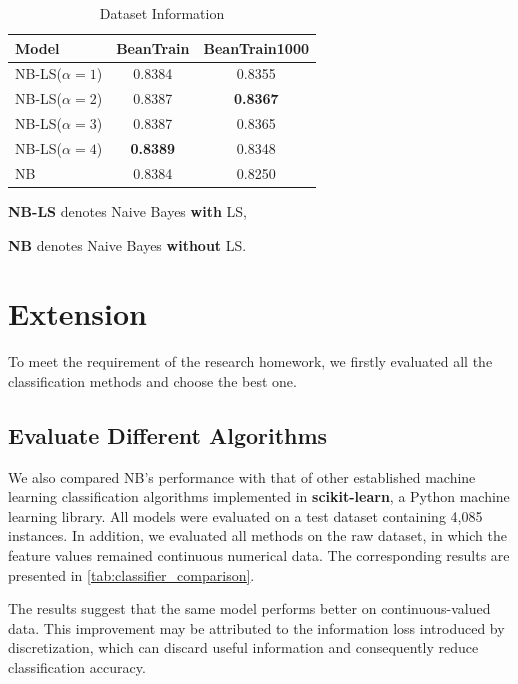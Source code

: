 \documentclass[10pt,a4paper]{article}
\begin{document}
	
	\begin{table}[htbp]
		\centering
		\caption{Dataset Information}
		\label{tab:test1}
		\begin{threeparttable}
			\begin{tabular}{lcc}
				\toprule
				\textbf{Model} & \textbf{BeanTrain} & \textbf{BeanTrain1000} \\
				\midrule
				NB-LS($ \alpha = 1 $) & 0.8384 & 0.8355 \\
				NB-LS($ \alpha = 2 $) & 0.8387 & \textbf{0.8367} \\
				NB-LS($ \alpha = 3 $) & 0.8387 & 0.8365 \\
				NB-LS($ \alpha = 4 $) & \textbf{0.8389} & 0.8348 \\
				NB    & 0.8384 & 0.8250 \\
				
				\bottomrule
			\end{tabular}
			\begin{tablenotes}[flushleft]
				\footnotesize
				\item \textbf{NB-LS} denotes Naive Bayes \textbf{with} LS,
				\item \textbf{NB} denotes Naive Bayes \textbf{without} LS.
			\end{tablenotes}
		\end{threeparttable}
	\end{table}
	
	
	
	\section{Extension}
		To meet the requirement of the research homework, we firstly evaluated all the classification methods and choose the best one.
	\subsection{Evaluate Different Algorithms}
		We also compared NB's performance with that of other established machine learning classification algorithms implemented in \textbf{scikit-learn}, a Python machine learning library. All models were evaluated on a test dataset containing 4,085 instances. In addition, we evaluated all methods on the raw dataset, in which the feature values remained continuous numerical data. The corresponding results are presented in \autoref{tab:classifier_comparison}.
		
		The results suggest that the same model performs better on continuous-valued data. This improvement may be attributed to the information loss introduced by discretization, which can discard useful information and consequently reduce classification accuracy. 
	
\end{document}
